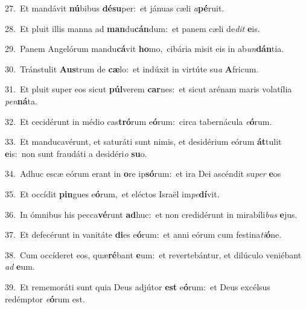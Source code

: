 {\numbfont\textcolor{\numbcolor}{27.}}~Et mandávit \textbf{nú}\-bibus \textbf{dé}\-\textbf{su}per:~\star et jánuas cæli \textit{a}\-\textbf{pé}ruit.\par
{\numbfont\textcolor{\numbcolor}{28.}}~Et pluit illis manna ad \textbf{man}\-du\-\textbf{cán}\-dum:~\star et panem cæli de\textit{dit} \textbf{e}\-is.\par
{\numbfont\textcolor{\numbcolor}{29.}}~Panem Angelórum mandu\-\textbf{cá}\-vit \textbf{ho}\-mo,~\star cibária misit eis in ab\-\textit{un}\-\textbf{dán}tia.\par
{\numbfont\textcolor{\numbcolor}{30.}}~Tránstulit \textbf{Aus}\-trum de \textbf{cæ}\-lo:~\star et indúxit in virtúte su\textit{a} \textbf{A}\-fricum.\par
{\numbfont\textcolor{\numbcolor}{31.}}~Et pluit super eos sicut \textbf{púl}\-verem \textbf{car}\-nes:~\star et sicut arénam maris volatília \textit{pen}\-\textbf{ná}ta.\par
{\numbfont\textcolor{\numbcolor}{32.}}~Et cecidérunt in médio cas\-\textbf{tró}\-rum e\-\textbf{ó}\-rum:~\star circa tabernácula \textit{e}\-\textbf{ó}rum.\par
{\numbfont\textcolor{\numbcolor}{33.}}~Et manducavérunt, et saturáti sunt nimis, et desidérium eórum \textbf{át}\-tulit \textbf{e}\-is:~\star non sunt fraudáti a desidéri\textit{o} \textbf{su}\-o.\par
{\numbfont\textcolor{\numbcolor}{34.}}~Adhuc escæ eórum erant in \textbf{o}\-re ip\-\textbf{só}\-rum:~\star et ira Dei ascéndit su\textit{per} \textbf{e}\-os\par
{\numbfont\textcolor{\numbcolor}{35.}}~Et occídit \textbf{pin}\-gues e\-\textbf{ó}\-rum,~\star et eléctos Israël im\-\textit{pe}\-\textbf{dí}vit.\par
{\numbfont\textcolor{\numbcolor}{36.}}~In ómnibus his pecca\-\textbf{vé}\-runt \textbf{ad}\-huc:~\star et non credidérunt in mirabíli\textit{bus} \textbf{e}\-jus.\par
{\numbfont\textcolor{\numbcolor}{37.}}~Et defecérunt in vanitáte \textbf{di}\-es e\-\textbf{ó}\-rum:~\star et anni eórum cum festina\-\textit{ti}\-\textbf{ó}ne.\par
{\numbfont\textcolor{\numbcolor}{38.}}~Cum occíderet eos, quæ\-\textbf{ré}\-bant \textbf{e}\-um:~\star et revertebántur, et dilúculo veniébant \textit{ad} \textbf{e}\-um.\par
{\numbfont\textcolor{\numbcolor}{39.}}~Et rememoráti sunt quia Deus adjútor \textbf{est} e\-\textbf{ó}\-rum:~\star et Deus excélsus redémptor \textit{e}\-\textbf{ó}rum est.\par
